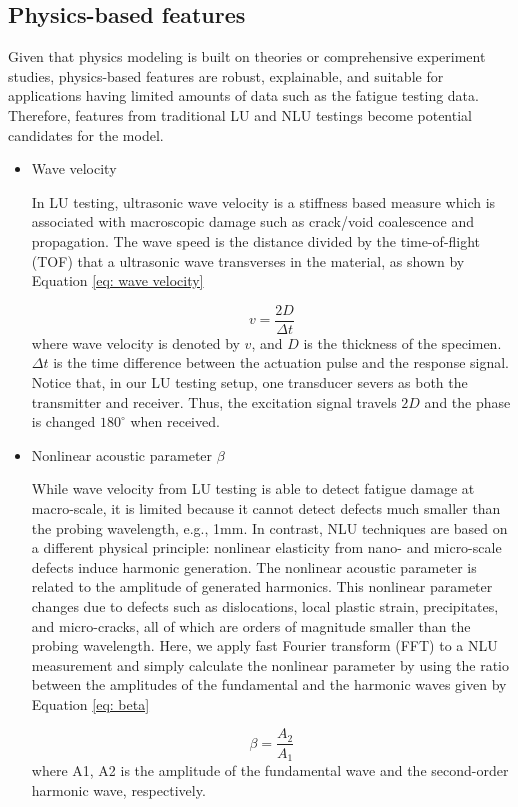 \subsection{Physics-based features}
Given that physics modeling is built on theories or comprehensive experiment studies, physics-based features are robust, explainable, and suitable for applications having limited amounts of data such as the fatigue testing data. Therefore, features from traditional LU and NLU testings become potential candidates for the model.
\begin{itemize}
    \item Wave velocity
    
    In LU testing, ultrasonic wave velocity is a stiffness based measure which is associated with macroscopic damage such as crack/void coalescence and propagation. The wave speed is the distance divided by the time-of-flight (TOF) that a ultrasonic wave transverses in the material, as shown by Equation \eqref{eq: wave velocity}
    
    \begin{equation}
        v = \frac{2D}{\Delta t}
        \label{eq: wave velocity}
    \end{equation}
    where wave velocity is denoted by $v$, and $D$ is the thickness of the specimen. $\Delta t$ is the time difference between the actuation pulse and the response signal. Notice that, in our LU testing setup, one transducer severs as both the transmitter and receiver. Thus, the excitation signal travels $2D$ and the phase is changed $180^{\circ} $ when received.

    \item Nonlinear acoustic parameter $\beta$
    
    While wave velocity from LU testing is able to detect fatigue damage at macro-scale, it is limited because it cannot detect defects much smaller than the probing wavelength, e.g., 1mm. In contrast, NLU techniques are based on a different physical principle: nonlinear elasticity from nano- and micro-scale defects induce harmonic generation. The nonlinear acoustic parameter is related to the amplitude of generated harmonics. This nonlinear parameter changes due to defects such as dislocations, local plastic strain, precipitates, and micro-cracks, all of which are orders of magnitude smaller than the probing wavelength. Here, we apply fast Fourier transform (FFT) to a NLU measurement and simply calculate the nonlinear parameter by using the ratio between the amplitudes of the fundamental and the harmonic waves given by Equation \eqref{eq: beta}

    \begin{equation}
        \beta = \frac{A_2}{A_1}
        \label{eq: beta}
    \end{equation}
    where A1, A2 is the amplitude of the fundamental wave and the second-order harmonic wave, respectively.
\end{itemize}

